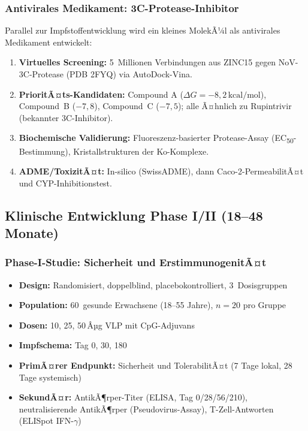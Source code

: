 ﻿\documentclass[a4paper,12pt]{article}
\theoremstyle{plain}
\theoremstyle{definition}
\theoremstyle{remark}
\begin{document}
\subsubsection{Antivirales Medikament: 3C-Protease-Inhibitor}

Parallel zur Impfstoffentwicklung wird ein kleines MolekÃ¼l als antivirales
Medikament entwickelt:

\begin{enumerate}
  \item \textbf{Virtuelles Screening:} 5~Millionen Verbindungen aus ZINC15 gegen
        NoV-3C-Protease (PDB 2FYQ) via AutoDock-Vina.
  \item \textbf{PrioritÃ¤ts-Kandidaten:} Compound A ($\Delta G=-8{,}2\,\text{kcal/mol}$),
        Compound~B ($-7{,}8$), Compound~C ($-7{,}5$); alle Ã¤hnlich zu Rupintrivir
        (bekannter 3C-Inhibitor).
  \item \textbf{Biochemische Validierung:} Fluoreszenz-basierter Protease-Assay
        (EC\textsubscript{50}-Bestimmung), Kristallstrukturen der Ko-Komplexe.
  \item \textbf{ADME/ToxizitÃ¤t:} In-silico (SwissADME), dann Caco-2-PermeabilitÃ¤t
        und CYP-Inhibitionstest.
\end{enumerate}

\subsection{Klinische Entwicklung Phase I/II (18--48 Monate)}

\subsubsection{Phase-I-Studie: Sicherheit und ErstimmunogenitÃ¤t}

\begin{itemize}
  \item \textbf{Design:} Randomisiert, doppelblind, placebokontrolliert, 3~Dosisgruppen
  \item \textbf{Population:} 60~gesunde Erwachsene (18--55 Jahre), $n=20$ pro Gruppe
  \item \textbf{Dosen:} 10, 25, 50\,Âµg VLP mit CpG-Adjuvans
  \item \textbf{Impfschema:} Tag 0, 30, 180
  \item \textbf{PrimÃ¤rer Endpunkt:} Sicherheit und TolerabilitÃ¤t (7 Tage lokal,
        28 Tage systemisch)
  \item \textbf{SekundÃ¤r:} AntikÃ¶rper-Titer (ELISA, Tag 0/28/56/210),
        neutralisierende AntikÃ¶rper (Pseudovirus-Assay),
        T-Zell-Antworten (ELISpot IFN-$\gamma$)
\end{itemize}
\end{document}
